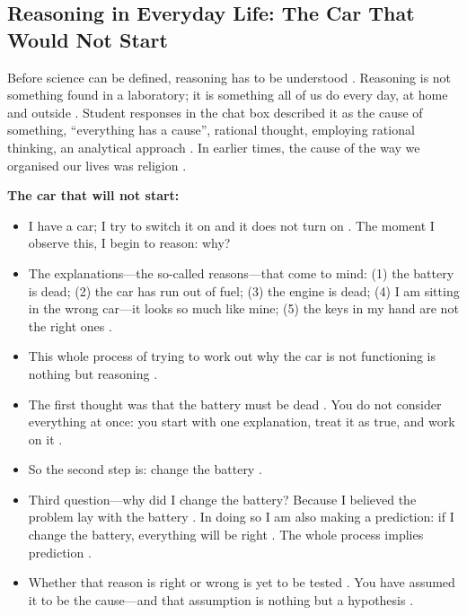 \subsection{Reasoning in Everyday Life: The Car That Would Not Start}
Before science can be defined, reasoning has to be understood . Reasoning is not something found in a laboratory; it is something all of us do every day, at home and outside . Student responses in the chat box described it as the cause of something, ``everything has a cause'', rational thought, employing rational thinking, an analytical approach . In earlier times, the cause of the way we organised our lives was religion .

\begin{ExampleBox}
\textbf{The car that will not start:}
\begin{itemize}
    \item I have a car; I try to switch it on and it does not turn on . The moment I observe this, I begin to reason: why? 
    \item The explanations---the so-called reasons---that come to mind: (1) the battery is dead; (2) the car has run out of fuel; (3) the engine is dead; (4) I am sitting in the wrong car---it looks so much like mine; (5) the keys in my hand are not the right ones .
    \item This whole process of trying to work out why the car is not functioning is nothing but reasoning .
    \item The first thought was that the battery must be dead . You do not consider everything at once: you start with one explanation, treat it as true, and work on it .
    \item So the second step is: change the battery .
    \item Third question---why did I change the battery? Because I believed the problem lay with the battery . In doing so I am also making a prediction: if I change the battery, everything will be right . The whole process implies prediction .
    \item Whether that reason is right or wrong is yet to be tested . You have assumed it to be the cause---and that assumption is nothing but a hypothesis .
\end{itemize}
\end{ExampleBox}

